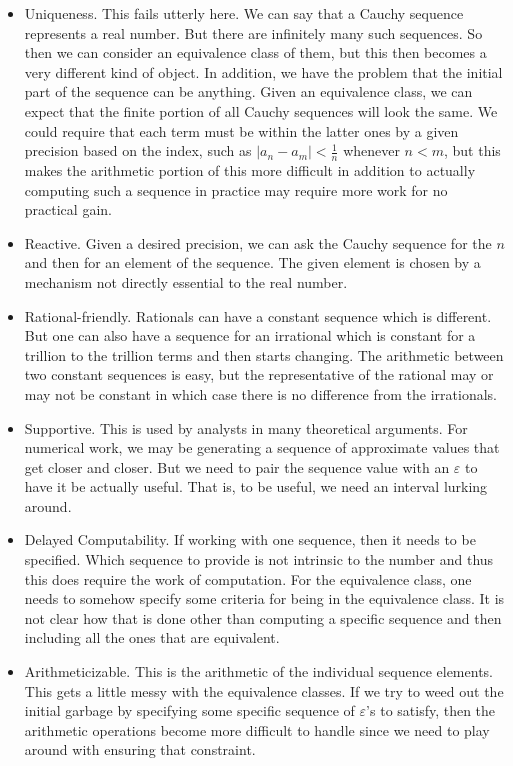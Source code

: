 \documentclass[12pt]{article}
\begin{document}
\begin{itemize}
    \item Uniqueness. This fails utterly here. We can say that a Cauchy sequence represents a real number. But there are infinitely many such sequences. So then we can consider an equivalence class of them, but this then becomes a very different kind of object. In addition, we have the problem that the initial part of the sequence can be anything. Given an equivalence class, we can expect that the finite portion of all Cauchy sequences will look the same. We could require that each term must be within the latter ones by a given precision based on the index, such as $|a_n - a_m| < \tfrac{1}{n}$ whenever $n < m$, but this makes the arithmetic portion of this more difficult in addition to actually computing such a sequence in practice may require more work for no practical gain. 
    \item Reactive. Given a desired precision, we can ask the Cauchy sequence for the $n$ and then for an element of the sequence. The given element is chosen by a mechanism not directly essential to the real number. 
    \item Rational-friendly. Rationals can have a constant sequence which is different. But one can also have a sequence for an irrational which is constant for a trillion to the trillion terms and then starts changing. The arithmetic between two constant sequences is easy, but the representative of the rational may or may not be constant in which case there is no difference from the irrationals.   
    \item Supportive. This is used by analysts in many theoretical arguments. For numerical work, we may be generating a sequence of approximate values that get closer and closer. But we need to pair the sequence value with an $\varepsilon$ to have it be actually useful. That is, to be useful, we need an interval lurking around. 
    \item Delayed Computability. If working with one sequence, then it needs to be specified. Which sequence to provide is not intrinsic to the number and thus this does require the work of computation.  For the equivalence class, one needs to somehow specify some criteria for being in the equivalence class. It is not clear how that is done other than computing a specific sequence and then including all the ones that are equivalent. 
    \item Arithmeticizable. This is the arithmetic of the individual sequence elements. This gets a little messy with the equivalence classes. If we try to weed out the initial garbage by specifying some specific sequence of $\varepsilon$'s to satisfy, then the arithmetic operations become more difficult to handle since we need to play around with ensuring that constraint.  

\end{itemize}
\end{document}
